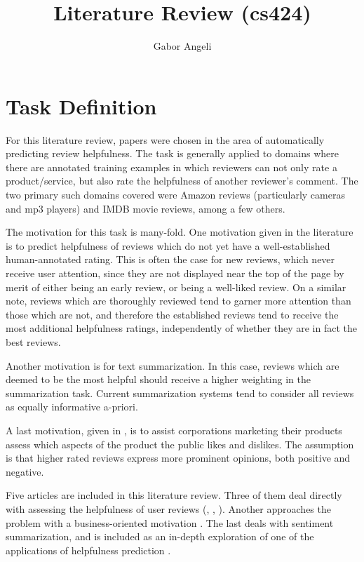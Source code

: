 \documentclass[12pt,letterpaper]{article}
\title{Literature Review (cs424)}
\author{Gabor Angeli}
\begin{document}
\maketitle

\section{Task Definition}
For this literature review, papers were chosen in the area of automatically predicting review helpfulness.
The task is generally applied to domains where there are annotated training examples in which
	reviewers can not only rate a product/service, but also rate the helpfulness of another
	reviewer's comment.
The two primary such domains covered were Amazon reviews (particularly cameras and mp3 players) 
	and IMDB movie reviews, among a few others.

The motivation for this task is many-fold.
One motivation given in the literature is to predict helpfulness of reviews which do not yet have a well-established
	human-annotated rating.
This is often the case for new reviews, which never receive user attention, since they are not displayed
	near the top of the page by merit of either being an early review, or being a well-liked review.
On a similar note, reviews which are thoroughly reviewed tend to garner more attention than those which
	are not, and therefore the established reviews tend to receive the most additional helpfulness ratings,
	independently of whether they are in fact the best reviews.

Another motivation is for text summarization.
In this case, reviews which are deemed to be the most helpful should receive a higher weighting in the
	summarization task. 
Current summarization systems tend to consider all reviews as equally informative a-priori.

A last motivation, given in , is to assist corporations marketing their
	products assess which aspects of the product the public likes and dislikes.
The assumption is that higher rated reviews express more prominent opinions, both positive and negative.

Five articles are included in this literature review. 
Three of them deal directly with assessing the
	helpfulness of user reviews (, , 
	).
Another approaches the problem with a business-oriented motivation \cite{2007ghose-helpfulness}.
The last deals with sentiment summarization, and is included as an in-depth exploration
	of one of the applications of helpfulness prediction \cite{2008titov-summarization}.
\end{document}
